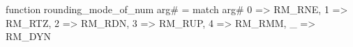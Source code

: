function rounding_mode_of_num arg# = match arg# {
  0 => RM_RNE,
  1 => RM_RTZ,
  2 => RM_RDN,
  3 => RM_RUP,
  4 => RM_RMM,
  _ => RM_DYN
}
